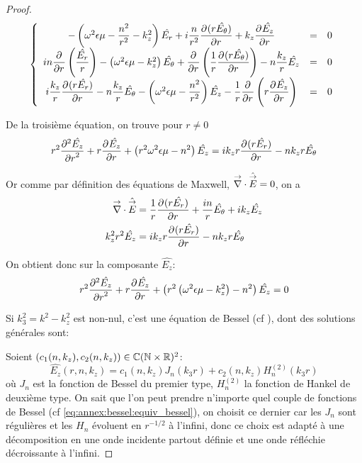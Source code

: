 \begin{proof}
    \begin{equation}
      \left\lbrace
      \begin{array}{ccc}
        -\left(\w^2\eps\mu -\frac{n^2}{r^2}  - k_z^2\right)\hat{E_r}  +i\frac{n}{r^2}\ddr{r}{(r\hat{E_\theta})}  +k_z\ddr{r}{\hat{E_z}} & = & 0\\
        in\ddr{r}{}\left(\frac{\hat{E_r}}{r}\right) -\left(\w^2\eps\mu - k_z^2\right)\hat{E_\theta} + \ddr{r}{}\left(\frac{1}{r}\ddr{r}{(r\hat{E_\theta})}\right)  - n\frac{k_z}{r}\hat{E_z} & = & 0\\
        i\frac{k_z}{r}\ddr{r}{(r\hat{E_r})}  - n\frac{k_z}{r}\hat{E_\theta}  -\left(\w^2\eps\mu - \frac{n^2}{r^2} \right)\hat{E_z} - \frac{1}{r}\ddr{r}{}\left(r\ddr{r}{\hat{E_z}}\right) & = & 0
      \end{array}
      \right.
    \end{equation}

    De la troisième  équation, on trouve pour \(r\not=0\)
    \begin{equation}
    r^2 \ddr[2]{r}{\hat{E_z}} + r\ddr{r}{\hat{E_z}} + \left(r^2\w^2\eps\mu - n^2\right)\hat{E_z} =ik_zr\ddr{r}{(r\hat{E_r})} -  nk_zr\hat{E_\theta}
    \end{equation}

    Or comme par définition des équations de Maxwell, \(\vdiv \hat \vE = 0\), on a
    \begin{align}
      \vdiv\hat \vE &= \frac{1}{r}\ddr{r}{(r\hat{E_r})} + \frac{in}{r}\hat{E_\theta} + ik_z\hat{E_z}
      \\
      k_z^2r^2 \hat{E_z} &= ik_zr\ddr{r}{(r\hat{E_r})} - nk_zr\hat{E_\theta}
    \end{align}

    On obtient donc sur la composante \(\hat{E_z}\):
    \begin{equation}
      r^2 \ddr[2]{r}{\hat{E_z}} + r\ddr{r}{\hat{E_z}} + \left(r^2\left(\w^2\eps\mu - k_z^2\right) - n^2\right)\hat{E_z} = 0
    \end{equation}

    Si \(k_3^2 = k^2 - k_z^2\) est non-nul, c'est une équation de Bessel (cf \cite[eq (6.80)]{bowman_introduction_1958}),%
    dont des solutions générales sont: 

    Soient \((c_1(n,k_z),c_2(n,k_z)) \in \CC(\NN\times\RR)^2\):
    \begin{equation}
      \hat{E_z}(r,n,k_z) = c_1(n,k_z) J_n\left(k_3r\right) + c_2(n,k_z) H_n^{(2)}\left(k_3r\right)
    \end{equation}
    où \(J_n\) est la fonction de Bessel du premier type, \(H_n^{(2)}\) la fonction de Hankel de deuxième type.
    On sait que l'on peut prendre n'importe quel couple de fonctions de Bessel (cf \eqref{eq:annex:bessel:equiv_bessel}), on choisit ce dernier car les \(J_n\) sont régulières et les \(H_n\) évoluent en \(r^{-1 \slash 2}\) à l'infini, donc ce choix est adapté à une décomposition en une onde incidente partout définie et une onde réfléchie décroissante à l'infini.


\end{proof}
